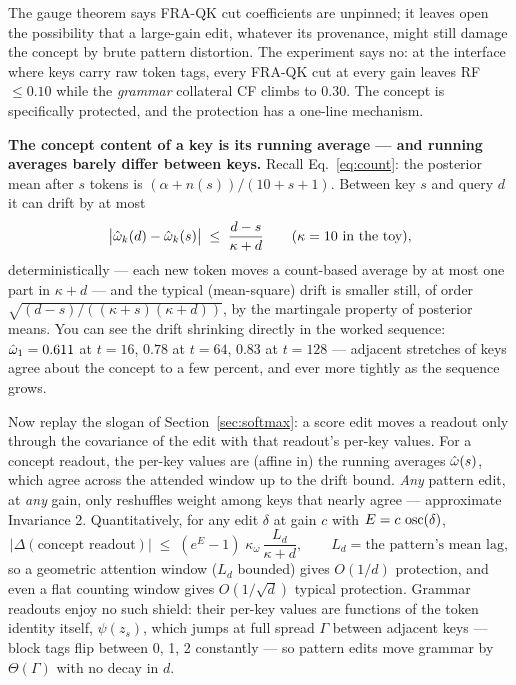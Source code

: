 \documentclass{article}
\begin{document}
The gauge theorem says FRA-QK cut coefficients are unpinned; it leaves open the possibility that a large-gain edit, whatever its provenance, might still damage the concept by brute pattern distortion. The experiment says no: at the interface where keys carry raw token tags, every FRA-QK cut at every gain leaves RF $\le 0.10$ while the \emph{grammar} collateral CF climbs to $0.30$. The concept is specifically protected, and the protection has a one-line mechanism.

\textbf{The concept content of a key is its running average --- and running averages barely differ between keys.} Recall Eq.~\eqref{eq:count}: the posterior mean after $s$ tokens is $(\alpha + n(s))/(10 + s + 1)$. Between key $s$ and query $d$ it can drift by at most
\begin{equation}\label{eq:drift}
    \big|\hat{\omega}_k(d) - \hat{\omega}_k(s)\big| \;\le\; \frac{d - s}{\kappa + d} \qquad (\kappa = 10 \text{ in the toy}),
\end{equation}
deterministically --- each new token moves a count-based average by at most one part in $\kappa + d$ --- and the typical (mean-square) drift is smaller still, of order $\sqrt{(d-s)/((\kappa+s)(\kappa+d))}$, by the martingale property of posterior means. You can see the drift shrinking directly in the worked sequence: $\hat{\omega}_1 = 0.611$ at $t = 16$, $0.78$ at $t = 64$, $0.83$ at $t = 128$ --- adjacent stretches of keys agree about the concept to a few percent, and ever more tightly as the sequence grows.

Now replay the slogan of Section~\ref{sec:softmax}: a score edit moves a readout only through the covariance of the edit with that readout's per-key values. For a concept readout, the per-key values are (affine in) the running averages $\hat{\omega}(s)$, which agree across the attended window up to the drift bound. \emph{Any} pattern edit, at \emph{any} gain, only reshuffles weight among keys that nearly agree --- approximate Invariance 2. Quantitatively, for any edit $\delta$ at gain $c$ with $E = c\,\operatorname{osc}(\delta)$,
\begin{equation}\label{eq:protection}
    \big|\Delta(\text{concept readout})\big| \;\le\; (e^{E} - 1)\;\kappa_\omega\, \frac{L_d}{\kappa + d}, \qquad L_d = \text{the pattern's mean lag},
\end{equation}
so a geometric attention window ($L_d$ bounded) gives $O(1/d)$ protection, and even a flat counting window gives $O(1/\sqrt d)$ typical protection. Grammar readouts enjoy no such shield: their per-key values are functions of the token identity itself, $\psi(z_s)$, which jumps at full spread $\Gamma$ between adjacent keys --- block tags flip between 0, 1, 2 constantly --- so pattern edits move grammar by $\Theta(\Gamma)$ with no decay in $d$.
\end{document}
